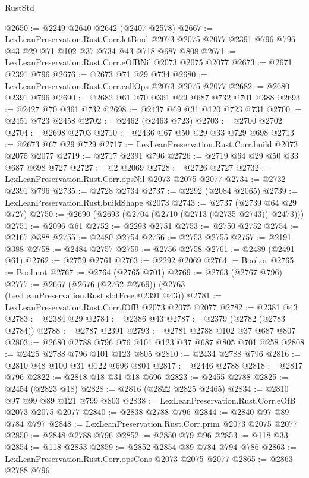 \begin{lexlean}{RustStd}
\begin{coremodule}
@2650 := @2249 @2640 @2642 (@2407 @2578)
@2667 := LexLeanPreservation.Rust.Corr.letBind
    @2073
    @2075
    @2077
    @2391
    @796
    @796
    @43
    @29
    @71
    @102
    @37
    @734
    @43
    @718
    @687
    @808
@2671 := LexLeanPreservation.Rust.Corr.eOfBNil @2073 @2075 @2077
@2673 := @2671 @2391 @796
@2676 := @2673 @71 @29 @734
@2680 := LexLeanPreservation.Rust.Corr.callOps @2073 @2075 @2077
@2682 := @2680 @2391 @796
@2690 := @2682 @61 @70 @361 @29 @687 @732 @701 @388
@2693 := @2427 @70 @361 @732
@2698 := @2437 @69 @31 @120 @723 @731
@2700 := @2451 @723 @2458
@2702 := @2462 (@2463 @723)
@2703 := @2700 @2702
@2704 := @2698 @2703
@2710 := @2436 @67 @50 @29 @33 @729 @698
@2713 := @2673 @67 @29 @729
@2717 := LexLeanPreservation.Rust.Corr.build @2073 @2075 @2077
@2719 := @2717 @2391 @796
@2726 := @2719 @64 @29 @50 @33 @687 @698 @727
@2727 := @2 @2069
@2728 := @2726 @2727
@2732 := LexLeanPreservation.Rust.Corr.opsNil @2073 @2075 @2077
@2734 := @2732 @2391 @796
@2735 := @2728 @2734
@2737 := @2292 (@2084 @2065)
@2739 := LexLeanPreservation.Rust.buildShape @2073
@2743 := @2737 (@2739 @64 @29 @727)
@2750 := @2690 (@2693 (@2704 (@2710 (@2713 (@2735 @2743)) @2473)))
@2751 := @2096 @61
@2752 := @2293 @2751
@2753 := @2750 @2752
@2754 := @2167 @388
@2755 := @2480 @2754
@2756 := @2753 @2755
@2757 := @2191 @388
@2758 := @2484 @2757
@2759 := @2756 @2758
@2761 := @2489 (@2491 @61)
@2762 := @2759 @2761
@2763 := @2292 @2069
@2764 := Bool.or
@2765 := Bool.not
@2767 := @2764 (@2765 @701)
@2769 := @2763 (@2767 @796)
@2777 := @2667 (@2676 (@2762 @2769)) (@2763 (LexLeanPreservation.Rust.slotFree @2391 @43))
@2781 := LexLeanPreservation.Rust.Corr.fOfB @2073 @2075 @2077
@2782 := @2381 @43
@2783 := @2384 @29
@2784 := @2386 @43
@2787 := @2379 (@2782 (@2783 @2784))
@2788 := @2787 @2391
@2793 := @2781 @2788 @102 @37 @687 @807
@2803 := @2680 @2788 @796 @76 @101 @123 @37 @687 @805 @701 @258
@2808 := @2425 @2788 @796 @101 @123 @805
@2810 := @2434 @2788 @796
@2816 := @2810 @48 @100 @31 @122 @696 @804
@2817 := @2446 @2788
@2818 := @2817 @796
@2822 := @2818 @18 @31 @18 @696
@2823 := @2455 @2788
@2825 := @2454 (@2823 @18)
@2828 := @2816 (@2822 @2825 @2465)
@2834 := @2810 @97 @99 @89 @121 @799 @803
@2838 := LexLeanPreservation.Rust.Corr.eOfB @2073 @2075 @2077
@2840 := @2838 @2788 @796
@2844 := @2840 @97 @89 @784 @797
@2848 := LexLeanPreservation.Rust.Corr.prim @2073 @2075 @2077
@2850 := @2848 @2788 @796
@2852 := @2850 @79 @96
@2853 := @118 @33
@2854 := @118 @2853
@2859 := @2852 @2854 @89 @784 @794 @786
@2863 := LexLeanPreservation.Rust.Corr.opsCons @2073 @2075 @2077
@2865 := @2863 @2788 @796

\end{coremodule}
\end{lexlean}
